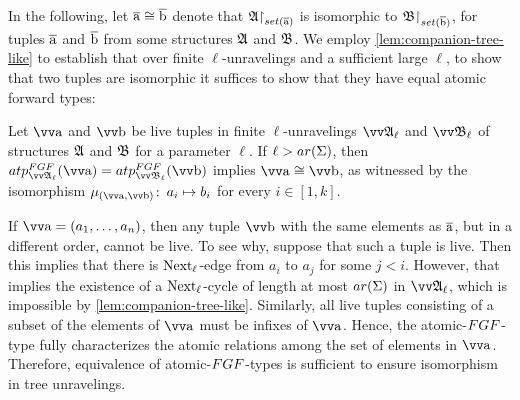 In the following, let $\overline{\mathrm{a}} \cong \overline{\mathrm{b}}$ denote that $\restr{\str{A}}{\set(\elemtuplea)}$ is isomorphic to $\restr{\str{B}}{\set(\elemtupleb)}$, for tuples $\overline{\mathrm{a}}$ and $\overline{\mathrm{b}}$ from some structures ${\mathfrak{A}}$ and ${\mathfrak{B}}$.
We employ \cref{lem:companion-tree-like} to establish that over finite $\ell$-unravelings and a sufficient large $\ell$, to show that two tuples are isomorphic it suffices to show that they have equal atomic forward types:
\begin{lemma}\label{lem:fgf-type-iso}
  Let $\elemtuptuplea$ and $\elemtuptupleb$ be live tuples in finite $\ell$-unravelings $\unravel{A}_{\ell}$ and $\unravel{B}_{\ell}$ of structures ${\mathfrak{A}}$ and ${\mathfrak{B}}$ for a parameter $\ell$.
  If $\ell > \arity(\Sigma)$, then $\atp{\FGF}{\unravel{A}_{\ell}}{\elemtuptuplea} = \atp{\FGF}{\unravel{B}_{\ell}}{\elemtuptupleb}$ implies $\elemtuptuplea \isoeq \elemtuptupleb$, as witnessed by the isomorphism $\mu_{(\elemtuptuplea, \elemtuptupleb)}\colon\, a_{i} \mapsto b_{i}$ for every $i \in [1, k]$.
\end{lemma}
\begin{proofsketch}
  If $\elemtuptuplea = (a_{1}, \ldots, a_{n})$, then any tuple $\elemtuptupleb$ with the same elements as $\overline{\mathrm{a}}$, but in a different order, cannot be live.
  To see why, suppose that such a tuple is live.
  Then this implies that there is $\mathrm{Next}_{\ell}$-edge from $a_{i}$ to $a_{j}$ for some $j < i$.
  However, that implies the existence of a $\mathrm{Next}_{\ell}$-cycle of length at most $\arity(\Sigma)$ in $\unravel{A}_{\ell}$, which is impossible by \cref{lem:companion-tree-like}.
  Similarly, all live tuples consisting of a subset of the elements of $\elemtuptuplea$ must be infixes of $\elemtuptuplea$.
  Hence, the atomic-$\FGF$-type fully characterizes the atomic relations among the set of elements in $\elemtuptuplea$.
  Therefore, equivalence of atomic-$\FGF$-types is sufficient to ensure isomorphism in tree unravelings.
\end{proofsketch}
